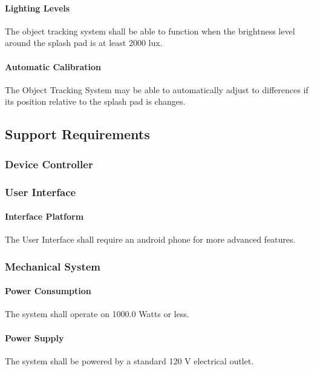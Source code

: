 \paragraph{Lighting Levels}
The object tracking system shall be able to function when the brightness level around the splash pad is at least 2000 lux.

\paragraph{Automatic Calibration}
The Object Tracking System may be able to automatically adjust to differences if its position relative to the splash pad is changes. 

\subsection{Support Requirements}

\subsubsection{Device Controller}
\subsubsection{User Interface}

\paragraph{Interface Platform}
The User Interface shall require an android phone for more advanced features. 

\subsubsection{Mechanical System}

\paragraph{Power Consumption}
The system shall operate on 1000.0 Watts or less.

\paragraph{Power Supply}
The system shall be powered by a standard 120 V electrical outlet. 


